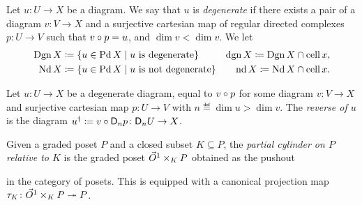 \begin{dfn} 
    Let \( u \colon U \to X \) be a diagram.
    We say that \( u \) is \emph{degenerate} if there exists a pair of a diagram \( v \colon V \to X \) and a surjective cartesian map of regular directed complexes \( p \colon U \to V \) such that \( v \circ p = u \), and \( \dim v < \dim v \). 
    We let
    \begin{align*}
        \operatorname{Dgn} X &\coloneqq \left\{ {u \in \operatorname{Pd} X \mid u \text{ is degenerate}} \right\} & \operatorname{dgn} X \coloneqq \operatorname{Dgn} X \cap \operatorname{cell} x,\\
        \operatorname{Nd} X & \coloneqq \left\{ {u \in \operatorname{Pd} X \mid u \text{ is not degenerate}} \right\} & \operatorname{nd} X \coloneqq \operatorname{Nd} X \cap \operatorname{cell} x.
    \end{align*}
\end{dfn}

\begin{dfn} 
    Let \( u \colon U \to X \) be a degenerate diagram, equal to \( v \circ p \) for some diagram \( v \colon V \to X \) and surjective cartesian map \( p \colon U \to V \) with \( n \eqdef \dim u > \dim v \).
    The \emph{reverse of \( u \)} is the diagram \( {u}^\dag \coloneqq v \circ \mathsf{D}_{n}{p} \colon \mathsf{D}_{n}{U} \to X \).
\end{dfn}

\begin{dfn}
    Given a graded poset \( P \) and a closed subset \( K \subseteq P \), the \emph{partial cylinder on \( P \) relative to \( K \)} is the graded poset \( \vec{O}^{1} \times_K P \) obtained as the pushout
    \begin{center}
    \end{center}
    in the category of posets.
    This is equipped with a canonical projection map \( \tau_K \colon \vec{O}^{1} \times_K P \twoheadrightarrow P \).
\end{dfn}

